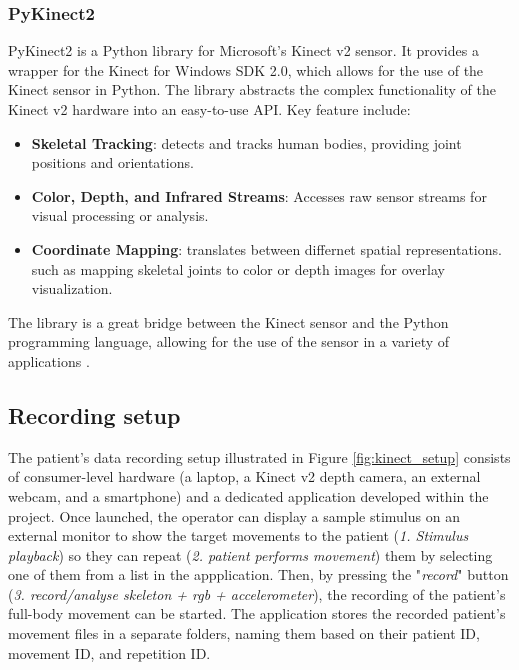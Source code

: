                     \subsubsection{PyKinect2}
                        PyKinect2 is a Python library for Microsoft's Kinect v2 sensor. It provides a wrapper for the Kinect for Windows SDK 2.0, which allows for the use of the Kinect sensor in Python. The library abstracts the complex functionality of the Kinect v2 hardware into an easy-to-use API. Key feature include:
                        \begin{itemize}
                            \item \textbf{Skeletal Tracking}: detects and tracks human bodies, providing joint positions and orientations.
                            \item \textbf{Color, Depth, and Infrared Streams}: Accesses raw sensor streams for visual processing or analysis.
                            \item \textbf{Coordinate Mapping}: translates between differnet spatial representations. such as mapping skeletal joints to color or depth images for overlay visualization.
                        \end{itemize}
                        The library is a great bridge between the Kinect sensor and the Python programming language, allowing for the use of the sensor in a variety of applications \cite{GitHubKinectPyKinect2}.
               
                        \newpage
                        
        \subsection{Recording setup}

                    The patient's data recording setup illustrated in Figure \ref{fig:kinect_setup} consists of consumer-level hardware (a laptop, a Kinect v2 depth camera, an external webcam, and a smartphone) and a dedicated application developed within the project. 
                    Once launched, the operator can display a sample stimulus on an external monitor to show the target movements to the patient (\textit{1. Stimulus playback}) so they can repeat (\textit{2. patient performs movement}) them by selecting one of them from a list in the appplication.
                    Then, by pressing the "\textit{record}" button (\textit{3. record/analyse skeleton + rgb + accelerometer}), the recording of the patient's full-body movement can be started. 
                    The application stores the recorded patient's movement files in a separate folders, naming them based on their patient ID, movement ID, and repetition ID.

